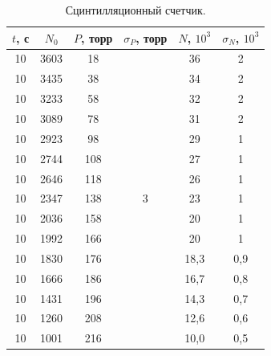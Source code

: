 \documentclass[a4paper,12pt]{article} %
\begin{document}
		\begin{table}[H]
			\caption{Сцинтилляционный счетчик.}
			\label{table:exp2}
			\begin{tabular}{|c|c|c|c|c|c|}
				\hline
				$t$, с & $N_0$ & $P$, торр & $\sigma_P$, торр    & $N$, $10^3$ & $\sigma_N$, $10^3$ \\ \hline
				10     & 3603  & 18        & \multirow{22}{*}{3} & 36          & 2                  \\ \cline{1-3} \cline{5-6} 
				10     & 3435  & 38        &                     & 34          & 2                  \\ \cline{1-3} \cline{5-6} 
				10     & 3233  & 58        &                     & 32          & 2                  \\ \cline{1-3} \cline{5-6} 
				10     & 3089  & 78        &                     & 31          & 2                  \\ \cline{1-3} \cline{5-6} 
				10     & 2923  & 98        &                     & 29          & 1                  \\ \cline{1-3} \cline{5-6} 
				10     & 2744  & 108       &                     & 27          & 1                  \\ \cline{1-3} \cline{5-6} 
				10     & 2646  & 118       &                     & 26          & 1                  \\ \cline{1-3} \cline{5-6} 
				10     & 2347  & 138       &                     & 23          & 1                  \\ \cline{1-3} \cline{5-6} 
				10     & 2036  & 158       &                     & 20          & 1                  \\ \cline{1-3} \cline{5-6} 
				10     & 1992  & 166       &                     & 20          & 1                  \\ \cline{1-3} \cline{5-6} 
				10     & 1830  & 176       &                     & 18,3        & 0,9                \\ \cline{1-3} \cline{5-6} 
				10     & 1666  & 186       &                     & 16,7        & 0,8                \\ \cline{1-3} \cline{5-6} 
				10     & 1431  & 196       &                     & 14,3        & 0,7                \\ \cline{1-3} \cline{5-6} 
				10     & 1260  & 208       &                     & 12,6        & 0,6                \\ \cline{1-3} \cline{5-6} 
				10     & 1001  & 216       &                     & 10,0        & 0,5                \\ \cline{1-3} \cline{5-6} 

\end{tabular}
\end{table}
\end{document}
